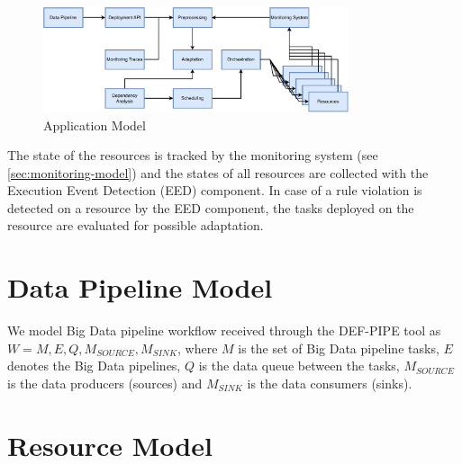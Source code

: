 
    \begin{figure}
        \centering
        \includegraphics[width=0.8\textwidth]{figures/application_model.pdf}
        \caption{Application Model}
        \label{fig:application-model}
    \end{figure}
    \noindent
    The state of the resources is tracked by the monitoring system (see \ref{sec:monitoring-model}) and the states of all resources are collected with the Execution Event Detection (EED) component. In case of a rule violation is detected on a resource by the EED component, the tasks deployed on the resource are evaluated for possible adaptation.

    \section{Data Pipeline Model}
    \label{sec:data-pipeline-model}

        We model Big Data pipeline workflow received through the DEF-PIPE tool as $W = M, E, Q, M_{SOURCE}, M_{SINK}$, where $M$ is the set of Big Data pipeline tasks, $E$ denotes the Big Data pipelines, $Q$ is the data queue between the tasks, $M_{SOURCE}$ is the data producers (sources) and $M_{SINK}$ is the data consumers (sinks).



    \section{Resource Model}
    \label{sec:resource-model}

